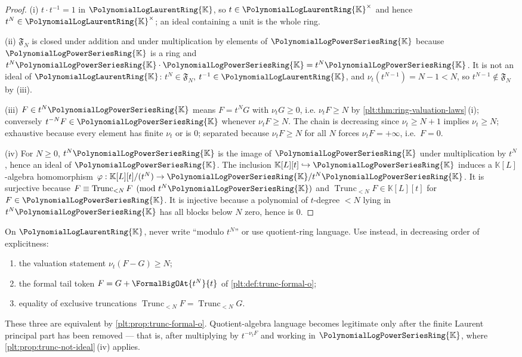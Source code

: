 \documentclass[11pt,oneside]{article}
\theoremstyle{plain}
\theoremstyle{definition}
\theoremstyle{remark}
\newcommand{\K}{\mathbb{K}}
\newcommand{\PLpow}{\PolynomialLogPowerSeriesRing{\K}}   %
\newcommand{\PLlau}{\PolynomialLogLaurentRing{\K}}       %
\newcommand{\ordt}{\nu_{t}}                              %
\newcommand{\Trunc}[2]{\operatorname{Trunc}_{<#2}#1}     %
\begin{document}
\begin{proof}
(i)  \(t\cdot t^{-1}=1\) in \(\PLlau\), so \(t\in\PLlau^\times\) and hence
\(t^N\in\PLlau^\times\); an ideal containing a unit is the whole ring.

(ii)  \(\mathfrak F_N\) is closed under addition and under multiplication by
elements of \(\PLpow\) because \(\PLpow\) is a ring and
\(t^N\PLpow\cdot\PLpow= t^N\PLpow\).  It is not an ideal of \(\PLlau\):
\(t^N\in\mathfrak F_N\), \(t^{-1}\in\PLlau\), and
\(\ordt(t^{N-1})=N-1<N\), so \(t^{N-1}\notin\mathfrak F_N\) by (iii).

(iii)  \(F\in t^N\PLpow\) means \(F=t^NG\) with \(\ordt G\ge0\), i.e.
\(\ordt F\ge N\) by \cref{plt:thm:ring-valuation-laws}\,(i); conversely
\(t^{-N}F\in\PLpow\) whenever \(\ordt F\ge N\).  The chain is decreasing since
\(\ordt\ge N+1\) implies \(\ordt\ge N\); exhaustive because every element has
finite \(\ordt\) or is \(0\); separated because \(\ordt F\ge N\) for all \(N\)
forces \(\ordt F=+\infty\), i.e.\ \(F=0\).

(iv)  For \(N\ge0\), \(t^N\PLpow\) is the image of \(\PLpow\) under
multiplication by \(t^N\), hence an ideal of \(\PLpow\).  The inclusion
\(\K[L][t]\hookrightarrow\PLpow\) induces a \(\K[L]\)-algebra homomorphism
\(\varphi:\K[L][t]/(t^N)\to\PLpow/t^N\PLpow\).  It is surjective because
\(F\equiv\Trunc{F}{N}\pmod{t^N\PLpow}\) and \(\Trunc{F}{N}\in\K[L][t]\) for
\(F\in\PLpow\).  It is injective because a polynomial of \(t\)-degree \(<N\)
lying in \(t^N\PLpow\) has all blocks below \(N\) zero, hence is \(0\).
\end{proof}

\begin{checkpointbox}[title={The three legitimate replacements}]
\label{plt:rmk:trunc-replacements}
On \(\PLlau\), never write ``modulo \(t^N\)'' or use quotient-ring language.
Use instead, in decreasing order of explicitness:
\begin{enumerate}
\item the valuation statement \(\ordt(F-G)\ge N\);
\item the formal tail token \(F=G+\FormalBigOAt{t^N}{t}\) of
  \cref{plt:def:trunc-formal-o};
\item equality of exclusive truncations \(\Trunc{F}{N}=\Trunc{G}{N}\).
\end{enumerate}
These three are equivalent by \cref{plt:prop:trunc-formal-o}.  Quotient-algebra
language becomes legitimate only after the finite Laurent principal part has
been removed --- that is, after multiplying by \(t^{-\ordt F}\) and working in
\(\PLpow\), where \cref{plt:prop:trunc-not-ideal}\,(iv) applies.
\end{checkpointbox}
\end{document}
